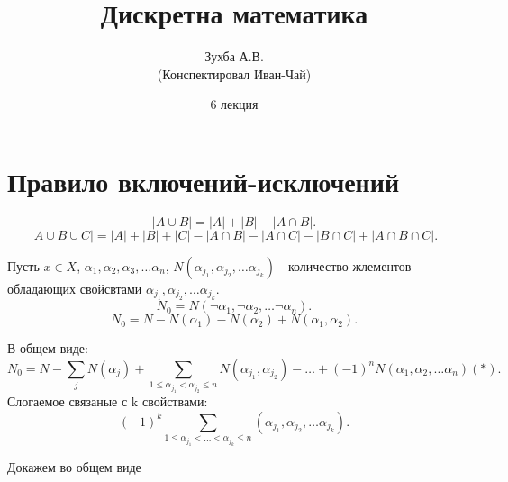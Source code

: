 \documentclass[a5paper, 10pt]{article}
\theoremstyle{plain}
\begin{document}
	\author{Зухба А.В.\\(Конспектировал Иван-Чай)}
	\date{6 лекция}
	\title{Дискретна математика}

	\linespread{1.4}
	\selectfont

	\maketitle
	\newpage

	\tableofcontents

    \section{Правило включений-исключений}

    \[
        | A \cup B | = | A | + | B | - | A \cap B |
    .\] \[
        | A \cup B \cup C | = | A | + | B | + | C | -
        | A \cap B | - | A \cap C | - | B \cap C | +
        | A \cap B \cap C |

    .\]

    Пусть
        $ x \in X $,
        $ \alpha_1, \alpha_2, \alpha_3, \dots \alpha_n $,
        $ N(\alpha_{j_1}, \alpha_{j_2}, \dots \alpha_{j_k}) $ -
        количество жлементов обладающих свойсвтами
        $ \alpha_{j_1}, \alpha_{j_2}, \dots \alpha_{j_k} $.
    \[
        N_0 = N(\neg \alpha_1, \neg \alpha_2, \dots \neg \alpha_n)
    .\] \[
        N_0 = N - N(\alpha_1) - N(\alpha_2) + N(\alpha_1, \alpha_2)
    .\]

    В общем виде:
    \[
        N_0 = N - \sum\limits_j N(\alpha_j) +
        \sum \limits_{1 \leq \alpha_{j_1} < \alpha_{j_2} \leq n}
        N(\alpha_{j_1}, \alpha_{j_2}) - \dots
        + (-1)^n N(\alpha_1, \alpha_2, \dots \alpha_n) (*)
    .\]
    Слогаемое связаные с k свойствами:
    \[
        (-1)^k \sum\limits_{1 \leq \alpha_{j_1} < \dots < \alpha_{j_k} \leq n}
        (\alpha_{j_1}, \alpha_{j_2}, \dots \alpha_{j_k})
    .\]

    Докажем во общем виде
\end{document}
